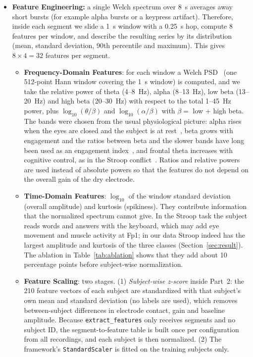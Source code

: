 \begin{itemize}[leftmargin=*]
    \item \textbf{Feature Engineering:} a single Welch spectrum over 8~s averages away short bursts (for example alpha bursts or a keypress artifact). Therefore, inside each segment we slide a 1~s window with a 0.25~s hop, compute 8 features per window, and describe the resulting series by its distribution (mean, standard deviation, 90th percentile and maximum). This gives $8 \times 4 = 32$ features per segment.
    \begin{itemize}
        \item \textbf{Frequency-Domain Features}: for each window a Welch PSD~\cite{welch1967} (one 512-point Hann window covering the 1~s window) is computed, and we take the relative power of theta (4--8~Hz), alpha (8--13~Hz), low beta (13--20~Hz) and high beta (20--30~Hz) with respect to the total 1--45~Hz power, plus $\log_{10}(\theta/\beta)$ and $\log_{10}(\alpha/\beta)$ with $\beta = $ low + high beta. The bands were chosen from the usual physiological picture: alpha rises when the eyes are closed and the subject is at rest~\cite{klimesch1999}, beta grows with engagement and the ratios between beta and the slower bands have long been used as an engagement index~\cite{pope1995}, and frontal theta increases with cognitive control, as in the Stroop conflict~\cite{cavanagh2014}. Ratios and relative powers are used instead of absolute powers so that the features do not depend on the overall gain of the dry electrode.
        \item \textbf{Time-Domain Features}: $\log_{10}$ of the window standard deviation (overall amplitude) and kurtosis (spikiness). They contribute information that the normalized spectrum cannot give. In the Stroop task the subject reads words and answers with the keyboard, which may add eye movement and muscle activity at Fp1; in our data Stroop indeed has the largest amplitude and kurtosis of the three classes (Section~\ref{sec:result}). The ablation in Table~\ref{tab:ablation} shows that they add about 10 percentage points before subject-wise normalization.
        \item \textbf{Feature Scaling}: two stages. (1) \emph{Subject-wise z-score} inside Part~2: the 210 feature vectors of each subject are standardized with that subject's own mean and standard deviation (no labels are used), which removes between-subject differences in electrode contact, gain and baseline amplitude. Because \texttt{extract\_features} only receives segments and no subject ID, the segment-to-feature table is built once per configuration from all recordings, and each subject is then normalized. (2) The framework's \texttt{StandardScaler} is fitted on the training subjects only. 

\end{itemize}
\end{itemize}

